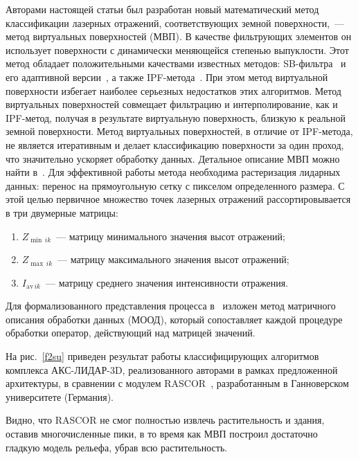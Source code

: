 \begin{multicols}{2}
   Авторами настоящей статьи был разработан новый математический метод 
классификации лазерных отражений, соответствующих земной 
   поверхности,~--- метод виртуальных поверхностей (МВП). В качестве 
фильтрующих элементов он использует поверхности с динамически 
меняющейся степенью выпуклости. Этот метод обладает положительными 
качествами известных методов: SB-фильтра~\cite{9su} и его адаптивной 
версии~\cite{10su}, а также IPF-метода~\cite{12su}. При этом метод 
виртуальной поверхности избегает наиболее серьезных недостатков этих 
алгоритмов.\linebreak
 Метод виртуальных поверхностей совмещает фильт\-ра\-цию и интерполирование, как и 
   IPF-метод, получая в результате виртуальную поверхность, близкую к 
реальной земной поверхности. Метод\linebreak
 виртуальных поверхностей, в отличие от IPF-ме\-то\-да, не является 
итеративным и делает классификацию поверхности за один проход, что 
значительно ускоряет обработку данных. Детальное описание МВП можно 
найти в~\cite{6su}. Для эффективной работы метода необходима растеризация 
лидарных данных: перенос на прямоугольную сетку с пикселом определенного 
размера. С этой целью первичное множество точек лазерных отражений 
рассортировывается в три двумерные матрицы:
   \begin{enumerate}[(1)]
   \item
   $Z_{\min\,ik}$~--- матрицу минимального значения высот отражений;
   \item $Z_{\max\,ik}$~--- матрицу максимального значения высот отражений;
   \item $I_{\mathrm{av}\,ik}$~--- матрицу среднего значения интенсивности отражения.
   \end{enumerate}
   
   Для формализованного представления процесса в~\cite{13su} изложен метод 
матричного описания обработки данных (МООД), который сопоставляет 
каждой процедуре обработки оператор, дейст\-ву\-ющий над матрицей значений.
   
   На рис.~\ref{f2su} приведен результат работы классифицирующих 
алгоритмов комплекса АКС-ЛИДАР-3D, реализованного авторами в рамках 
предложенной архитектуры, в сравнении с модулем \mbox{RASCOR}~\cite{14su}, 
разработанным в Ганноверском университете (Германия).
   
   Видно, что RASCOR не смог полностью извлечь растительность и здания, 
оставив многочисленные пики, в то время как МВП построил достаточно 
гладкую модель рельефа, убрав всю растительность.


\end{multicols}
